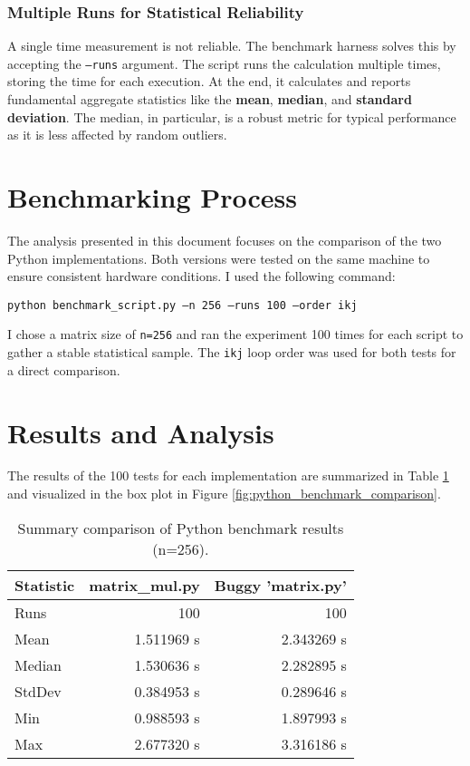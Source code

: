 \documentclass[a4paper]{article}
\begin{document}
\subsubsection{Multiple Runs for Statistical Reliability}
A single time measurement is not reliable. The benchmark harness solves this by accepting the \texttt{--runs} argument. The script runs the calculation multiple times, storing the time for each execution. At the end, it calculates and reports fundamental aggregate statistics like the \textbf{mean}, \textbf{median}, and \textbf{standard deviation}. The median, in particular, is a robust metric for typical performance as it is less affected by random outliers.

\section{Benchmarking Process}
The analysis presented in this document focuses on the comparison of the two Python implementations. Both versions were tested on the same machine to ensure consistent hardware conditions. I used the following command:

\texttt{python benchmark\_script.py --n 256 --runs 100 --order ikj}

I chose a matrix size of \texttt{n=256} and ran the experiment 100 times for each script to gather a stable statistical sample. The \texttt{ikj} loop order was used for both tests for a direct comparison.

\section{Results and Analysis}
The results of the 100 tests for each implementation are summarized in Table \ref{tab:python_summary_comparison} and visualized in the box plot in Figure \ref{fig:python_benchmark_comparison}.

\begin{table}[h!]
    \centering
    \begin{tabular}{lrr}
        \toprule
        \textbf{Statistic} & \textbf{matrix\_mul.py} & \textbf{Buggy 'matrix.py'} \\
        \midrule
        Runs   & 100        & 100        \\
        Mean   & 1.511969 s & 2.343269 s \\
        Median & 1.530636 s & 2.282895 s \\
        StdDev & 0.384953 s & 0.289646 s \\
        Min    & 0.988593 s & 1.897993 s \\
        Max    & 2.677320 s & 3.316186 s \\
        \bottomrule
    \end{tabular}
    \caption{Summary comparison of Python benchmark results (n=256).}
    \label{tab:python_summary_comparison}
\end{table}
\end{document}
